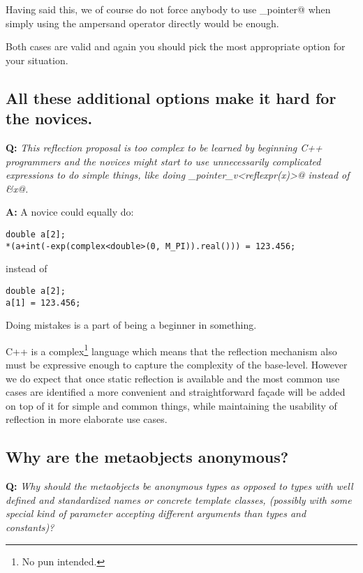 Having said this, we of course do not force anybody to use \verb@get_pointer@
when simply using the ampersand operator directly would be enough.

Both cases are valid and again you should pick the most appropriate option
for your situation.

\subsection{All these additional options make it hard for the novices.}
\label{faq-hard-on-novices}

\textbf{Q:} {\em This reflection proposal is too complex to be learned by
beginning C++ programmers and the novices might start to use unnecessarily
complicated expressions to do simple things, like doing
\verb@get_pointer_v<reflexpr(x)>@ instead of \verb@&x@.}

\textbf{A:} 
A novice could equally do:

\begin{verbatim}
double a[2];
*(a+int(-exp(complex<double>(0, M_PI)).real())) = 123.456;
\end{verbatim}

instead of

\begin{verbatim}
double a[2];
a[1] = 123.456;
\end{verbatim}

Doing mistakes is a part of being a beginner in something.

C++ is a complex\footnote{No pun intended.} language which means that
the reflection mechanism also must be expressive enough to capture
the complexity of the base-level.
However we do expect that once static reflection is available and the most
common use cases are identified a more convenient and straightforward
fa\c{c}ade will be added on top of it for simple and common things,
while maintaining the usability of reflection in more elaborate use cases.

\subsection{Why are the metaobjects anonymous?}

\textbf{Q:} {\em Why should the metaobjects be anonymous types as opposed to
types with well defined and standardized names or concrete template classes, (possibly with some
special kind of parameter accepting different arguments than types and constants)?}

